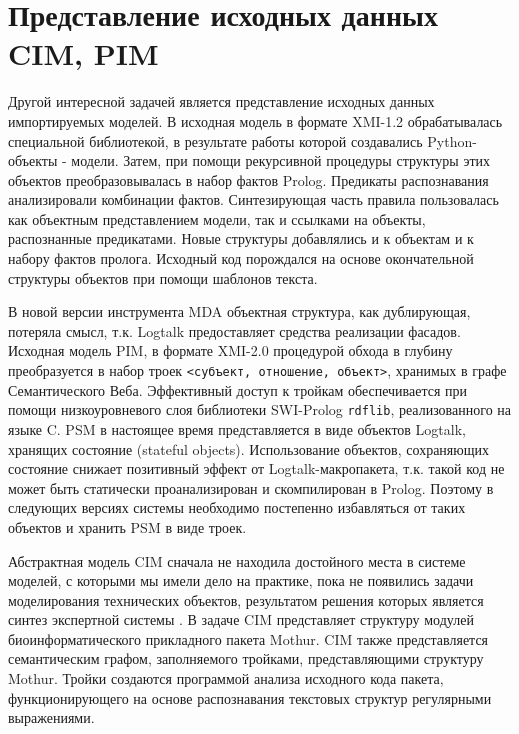 \documentclass[12pt]{article}
\begin{document}
\section{Представление исходных данных CIM, PIM}

Другой интересной задачей является представление исходных данных импортируемых моделей.  В \cite{paramonov} исходная модель в формате XMI-1.2 обрабатывалась специальной библиотекой, в результате работы которой создавались Python-объекты - модели.  Затем, при помощи рекурсивной процедуры структуры этих объектов преобразовывалась в набор фактов Prolog.  Предикаты распознавания анализировали комбинации фактов.  Синтезирующая часть правила пользовалась как объектным представлением модели, так и ссылками на объекты, распознанные предикатами.  Новые структуры добавлялись и к объектам и к набору фактов пролога.  Исходный код порождался на основе окончательной структуры объектов при помощи шаблонов текста.

В новой версии инструмента MDA объектная структура, как дублирующая, потеряла смысл, т.к. Logtalk предоставляет средства реализации фасадов.  Исходная модель PIM, в формате XMI-2.0 процедурой обхода в глубину преобразуется в набор троек \texttt{<субъект, отношение, объект>}, хранимых в графе Семантического Веба.  Эффективный доступ к тройкам обеспечивается при помощи низкоуровневого слоя библиотеки SWI-Prolog \texttt{rdflib}, реализованного на языке C.  PSM в настоящее время представляется в виде объектов Logtalk, хранящих состояние (stateful objects).  Использование объектов, сохраняющих состояние снижает позитивный эффект от Logtalk-макропакета, т.к. такой код не может быть статически проанализирован и скомпилирован в Prolog.  Поэтому в следующих версиях системы необходимо постепенно избавляться от таких объектов и хранить PSM в виде троек.

Абстрактная модель CIM сначала не находила достойного места в системе моделей, с которыми мы имели дело на практике, пока не появились задачи моделирования технических объектов, результатом решения которых является синтез экспертной системы \cite{nikita}.  В задаче \cite{ngs19} CIM представляет структуру модулей биоинформатического прикладного пакета Mothur.  CIM также представляется семантическим графом, заполняемого тройками, представляющими структуру Mothur.  Тройки создаются программой анализа исходного кода пакета, функционирующего на основе распознавания текстовых структур регулярными выражениями.
\end{document}
